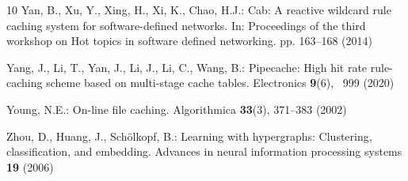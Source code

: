 \documentclass[11pt]{article}
\begin{document}
\begin{thebibliography}{10}
Yan, B., Xu, Y., Xing, H., Xi, K., Chao, H.J.: Cab: A reactive wildcard rule
  caching system for software-defined networks. In: Proceedings of the third
  workshop on Hot topics in software defined networking. pp. 163--168 (2014)

Yang, J., Li, T., Yan, J., Li, J., Li, C., Wang, B.: Pipecache: High hit rate
  rule-caching scheme based on multi-stage cache tables. Electronics
  \textbf{9}(6), ~999 (2020)

Young, N.E.: On-line file caching. Algorithmica  \textbf{33}(3),  371--383
  (2002)

Zhou, D., Huang, J., Sch{\"o}lkopf, B.: Learning with hypergraphs: Clustering,
  classification, and embedding. Advances in neural information processing
  systems  \textbf{19} (2006)

\end{thebibliography}
\end{document}
